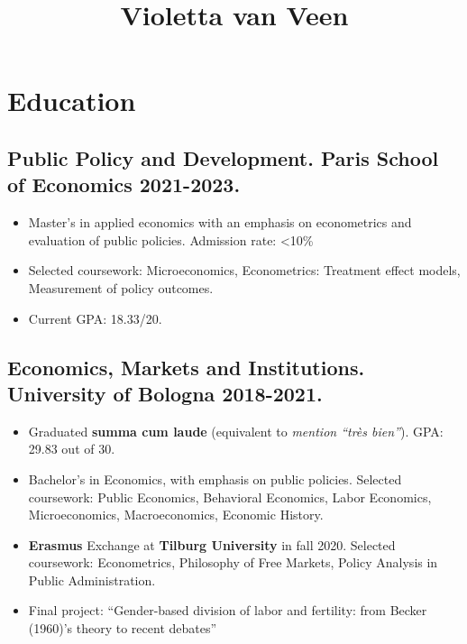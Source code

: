 \documentclass[10pt, a4paper]{extarticle}
\title{Violetta van Veen}
\author{}
\begin{document}
\maketitle
\vspace{-0.8em}
\hrulefill


\hypertarget{education}{%
\section{Education}\label{education}}

\subsection{\textbf{Public Policy and Development}. Paris School of Economics
\textbar{} 2021-2023.}

\begin{itemize}
\item
  Master's in applied economics with an emphasis on econometrics and evaluation of public policies. Admission rate:
  \textless10\%
\item
  Selected coursework: Microeconomics, Econometrics: Treatment effect
  models, Measurement of policy outcomes.
\item
  Current GPA: 18.33/20.
\end{itemize}

\subsection{\textbf{Economics, Markets and Institutions.} University of Bologna
\textbar{} 2018-2021.}

\begin{itemize}
\item
  Graduated \textbf{summa cum laude} (equivalent to \emph{mention ``très
  bien''}). GPA: 29.83 out of 30.
\item
  Bachelor's in Economics, with emphasis on public policies. Selected
  coursework: Public Economics, Behavioral Economics, Labor Economics,
  Microeconomics, Macroeconomics, Economic History.
\item
  \textbf{Erasmus} Exchange at \textbf{Tilburg University} in fall 2020.
  Selected coursework: Econometrics, Philosophy of Free Markets, Policy
  Analysis in Public Administration.
\item
  Final project: ``Gender-based division of labor and fertility: from
  Becker (1960)'s theory to recent debates''
\end{itemize}
\end{document}
